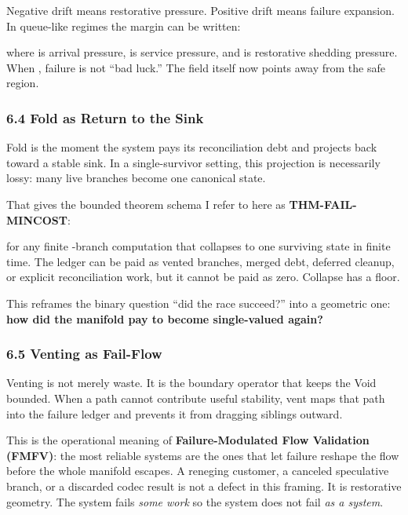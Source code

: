 \documentclass[
]{article}
\begin{document}
Negative drift means restorative pressure. Positive drift means failure
expansion. In queue-like regimes the margin can be written:

where is arrival pressure, is service pressure, and is restorative
shedding pressure. When , failure is not ``bad luck.'' The field itself
now points away from the safe region.

\subsubsection{\texorpdfstring{\textbf{6.4 Fold as Return to the
Sink}}{6.4 Fold as Return to the Sink}}\label{fold-as-return-to-the-sink}

Fold is the moment the system pays its reconciliation debt and projects
back toward a stable sink. In a single-survivor setting, this projection
is necessarily lossy: many live branches become one canonical state.

That gives the bounded theorem schema I refer to here as
\textbf{THM-FAIL-MINCOST}:

for any finite -branch computation that collapses to one surviving state
in finite time. The ledger can be paid as vented branches, merged debt,
deferred cleanup, or explicit reconciliation work, but it cannot be paid
as zero. Collapse has a floor.

This reframes the binary question ``did the race succeed?'' into a
geometric one: \textbf{how did the manifold pay to become single-valued
again?}

\subsubsection{\texorpdfstring{\textbf{6.5 Venting as
Fail-Flow}}{6.5 Venting as Fail-Flow}}\label{venting-as-fail-flow}

Venting is not merely waste. It is the boundary operator that keeps the
Void bounded. When a path cannot contribute useful stability, vent maps
that path into the failure ledger and prevents it from dragging siblings
outward.

This is the operational meaning of \textbf{Failure-Modulated Flow
Validation (FMFV)}: the most reliable systems are the ones that let
failure reshape the flow before the whole manifold escapes. A reneging
customer, a canceled speculative branch, or a discarded codec result is
not a defect in this framing. It is restorative geometry. The system
fails \emph{some work} so the system does not fail \emph{as a system}.
\end{document}
